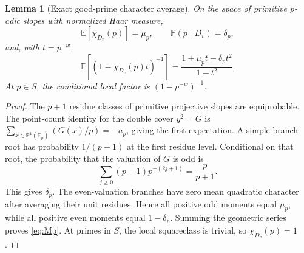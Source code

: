 \documentclass[11pt]{article}
\newtheorem{lemma}[theorem]{Lemma}
\newcommand{\F}{\mathbb{F}}
\begin{document}
\begin{lemma}[Exact good-prime character average]\label{lem:local}
On the space of primitive $p$-adic slopes with normalized Haar measure,
\[
 \mathbb E[\chi_{D_v}(p)]=\mu_p,\qquad
 \mathbb P(p\mid D_v)=\delta_p,
\]
and, with $t=p^{-w}$,
\begin{equation}\label{eq:Mp}
 \mathbb E[(1-\chi_{D_v}(p)t)^{-1}]
 =\frac{1+\mu_pt-\delta_pt^2}{1-t^2}.
\end{equation}
At $p\in S$, the conditional local factor is $(1-p^{-w})^{-1}$.
\end{lemma}
\begin{proof}
The $p+1$ residue classes of primitive projective slopes are equiprobable.  The point-count identity for the double cover $y^2=G$ is
$\sum_{x\in\mathbb P^1(\F_p)}(G(x)/p)=-a_p$, giving the first expectation.  A simple branch root has probability $1/(p+1)$ at the first residue level.  Conditional on that root, the probability that the valuation of $G$ is odd is
\[
 \sum_{j\ge0}(p-1)p^{-(2j+1)}=\frac{p}{p+1}.
\]
This gives $\delta_p$.  The even-valuation branches have zero mean quadratic character after averaging their unit residues.  Hence all positive odd moments equal $\mu_p$, while all positive even moments equal $1-\delta_p$.  Summing the geometric series proves \eqref{eq:Mp}.  At primes in $S$, the local squareclass is trivial, so $\chi_{D_v}(p)=1$.
\end{proof}
\end{document}
